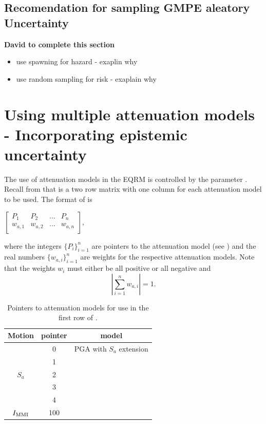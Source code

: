 \subsection{Recomendation for sampling GMPE aleatory Uncertainty}

\textbf{David to complete this section}
\begin{itemize}
\item use spawning for hazard - exaplin why
\item use random sampling for risk - exaplain why
\end{itemize}

\section{Using multiple attenuation models - Incorporating epistemic uncertainty}
\label{sec:attn-multi-attnmodels}

The use of attenuation models in the EQRM is controlled by the
 parameter .
Recall from  that
 is a two row matrix with one
column for each attenuation model to be used. The format of
 is
\begin{center}
\begin{math}
 \left[ \begin{array}{ccccc}
P_1 & P_2 &  \hdots & P_n \\
w_{a,1} & w_{a,2} &  \hdots & w_{a,n} \\
\end{array} \right],
\end{math}
\end{center}
where the integers $\{P_i\}_{i=1}^n$ are pointers to the
attenuation model (see ) and the real numbers
$\{w_{a,i}\}_{i=1}^n$ are weights for the respective attenuation
models. Note that the weights $w_i$ must either be all positive or
all negative and
\begin{equation}
\left|\sum_{i=1}^{n}w_{a,i}\right| = 1.
\end{equation}
\begin{table}
\caption{Pointers to attenuation models for use in the first row
of .} \vspace{0.8em}
\label{tab:attn-flags}
\begin{center}
\begin{tabular}{|c|c|c|}
\hline \textbf{Motion} & \textbf{pointer} & \textbf{model} \\
\hline
 & 0 & \cite{dr_Gaull90a} PGA with $S_a$ extension\\
 & 1 & \cite{dr_Toro97a} \\
$S_a$ & 2 & \cite{dr_Atkinson97a} \\
 & 3 & \cite{dr_Sadigh97a} \\
 & 4 & \cite{dr_Somerville01a} \\
\hline
 $\Imm$ & 100 & \cite{dr_Gaull90a} \\
\hline
\end{tabular}
\end{center}
\end{table}

